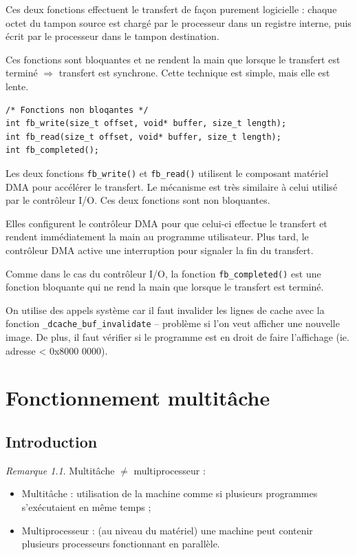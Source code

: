\documentclass[11pt,english,french]{scrreprt}
\theoremstyle{remark}
\newtheorem*{rem*}{Remarque}
\theoremstyle{definition}
\begin{document}
Ces deux fonctions effectuent le transfert de façon purement logicielle : chaque octet du tampon source est chargé par le processeur dans un registre interne, puis écrit par le processeur dans le tampon destination. 

Ces fonctions sont bloquantes et ne rendent la main que lorsque le transfert est terminé $\Rightarrow$ transfert est synchrone. Cette technique est simple, mais elle est lente.

\begin{lstlisting}
/* Fonctions non bloqantes */
int fb_write(size_t offset, void* buffer, size_t length);
int fb_read(size_t offset, void* buffer, size_t length);
int fb_completed();
\end{lstlisting}

Les deux fonctions \lstinline!fb_write()! et \lstinline!fb_read()! utilisent le composant matériel DMA pour accélérer le transfert. Le mécanisme est très similaire à celui utilisé par le contrôleur I/O. Ces deux fonctions sont non bloquantes. 

Elles configurent le contrôleur DMA pour que celui-ci effectue le transfert et rendent immédiatement la main au programme utilisateur. Plus tard, le contrôleur DMA active une interruption pour signaler la fin du transfert. 

Comme dans le cas du contrôleur I/O, la fonction \lstinline!fb_completed()! est une fonction bloquante qui ne rend la main que lorsque le transfert est terminé.

On utilise des appels système car il faut invalider les lignes de cache avec la fonction \lstinline!_dcache_buf_invalidate! -- problème si l'on veut afficher une nouvelle image. De plus, il faut vérifier si le programme est en droit de faire l'affichage (ie. adresse < 0x8000 0000).

\chapter{Fonctionnement multitâche} %

\section{Introduction} %

\begin{rem*}
	Multitâche $\neq$ multiprocesseur :\begin{itemize}
		\item Multitâche : utilisation de la machine comme si plusieurs programmes s'exécutaient en même temps ;
		\item Multiprocesseur : (au niveau du matériel) une machine peut contenir plusieurs processeurs fonctionnant en parallèle.
	\end{itemize}
\end{rem*}
\end{document}
